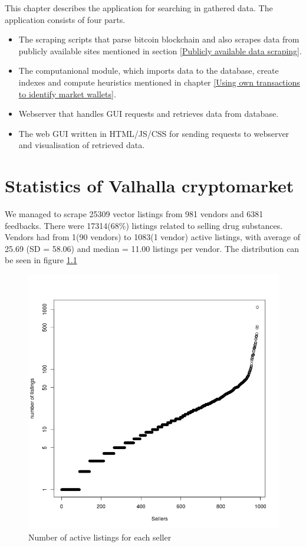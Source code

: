 \documentclass[
  digital, %
  table,   %
  lof,     %
  lot,     %
  oneside
]{fithesis3}
\begin{document}
This chapter describes the application for searching in gathered data.
The application consists of four parts.

\begin{itemize}
 \item The scraping scripts that parse bitcoin blockchain and also scrapes data from publicly available sites mentioned in section \ref{Publicly available data scraping}.
 \item The computanional module, which imports data to the database, create indexes and compute heuristics mentioned in chapter \ref{Using own transactions to identify market wallets}.
 \item Webserver that handles GUI requests and retrieves data from database.
 \item The web GUI written in HTML/JS/CSS for sending requests to webserver and visualisation of retrieved data. 
\end{itemize}



\chapter{Statistics of Valhalla cryptomarket}

We managed to scrape 25309 vector listings from 981 vendors and 6381 feedbacks.
There were 17314(68\%) listings related to selling drug substances.
Vendors had from 1(90 vendors) to 1083(1 vendor)
active listings, with average of 25.69 (SD = 58.06)
and median = 11.00 listings per vendor.
The distribution can be seen in figure \ref{listingsxsellers}

\begin{figure}[!htb]
    \centering
    \includegraphics[scale=0.4]{listingsxsellers}
    \caption{Number of active listings for each seller}
    \label{listingsxsellers}
\end{figure}
\end{document}
